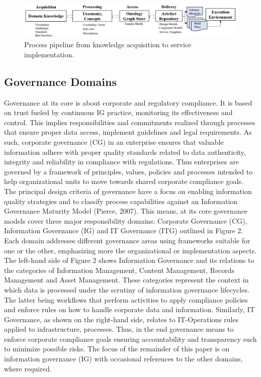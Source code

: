 \documentclass[a4paper,twoside]{article}
\begin{document}
\begin{figure}[!hbtp]
  \centering
   \includegraphics[width=\textwidth]{images/Fig1-Processpipe.png}
    \caption{Process pipeline from knowledge acquisition to service implementation.}
  \label{fig:procpipe}
\end{figure}
\subsection{{Governance Domains}}
Governance at its core is about corporate and regulatory compliance. It is based on trust fueled by continuous IG practice, monitoring its effectiveness and control. This implies responsibilities and commitments realized through processes that ensure proper data access, implement guidelines and legal requirements. As such, corporate governance (CG) in an enterprise ensures that valuable information adhere with proper quality standards related to data authenticity, integrity and reliability in compliance with regulations. Thus enterprises are governed by a framework of principles, values, policies and processes intended to help organizational units to move towards shared corporate compliance goals. 
The principal design criteria of governance have a focus on enabling information quality strategies and to classify process capabilities against an Information Governance Maturity Model (Pierce, 2007). This means, at its core governance models cover three major responsibility domains: Corporate Governance (CG), Information Governance (IG) and IT Governance (ITG) outlined in Figure 2. Each domain addresses different governance areas using frameworks suitable for one or the other, emphasizing more the organizational or implementation aspects. 
The left-hand side of Figure 2 shows Information Governance and its relations to the categories of Information Management, Content Management, Records Management and Asset Management. These categories represent the context in which data is processed under the scrutiny of information governance lifecycles. The latter being workflows that perform activities to apply compliance policies and enforce rules on how to handle corporate data and information. Similarly, IT Governance, as shown on the right-hand side, relates to IT-Operations rules applied to infrastructure, processes. Thus, in the end governance means to enforce corporate compliance goals ensuring accountability and transparency such to minimize possible risks. 
The focus of the remainder of this paper is on information governance (IG) with occasional references to the other domains, where required.
\end{document}
